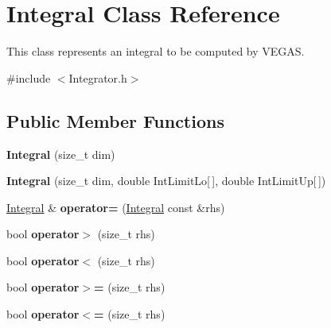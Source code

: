 \hypertarget{classIntegral}{}\section{Integral Class Reference}
\label{classIntegral}


This class represents an integral to be computed by V\+E\+G\+A\+S.  




{\ttfamily \#include $<$Integrator.\+h$>$}

\subsection*{Public Member Functions}
\begin{DoxyCompactItemize}
\item 
\hypertarget{classIntegral_a958228701e11668d62cb716a794627ae}{}{\bfseries Integral} (size\+\_\+t dim)\label{classIntegral_a958228701e11668d62cb716a794627ae}

\item 
\hypertarget{classIntegral_af859a39ddd8447a08351b2185b4fa4dc}{}{\bfseries Integral} (size\+\_\+t dim, double Int\+Limit\+Lo\mbox{[}$\,$\mbox{]}, double Int\+Limit\+Up\mbox{[}$\,$\mbox{]})\label{classIntegral_af859a39ddd8447a08351b2185b4fa4dc}

\item 
\hypertarget{classIntegral_af89fcd97e32bbacc527b3f5002498d52}{}\hyperlink{classIntegral}{Integral} \& {\bfseries operator=} (\hyperlink{classIntegral}{Integral} const \&rhs)\label{classIntegral_af89fcd97e32bbacc527b3f5002498d52}

\item 
\hypertarget{classIntegral_a22bfa4c5fcccc8921f314a0594d10273}{}bool {\bfseries operator$>$} (size\+\_\+t rhs)\label{classIntegral_a22bfa4c5fcccc8921f314a0594d10273}

\item 
\hypertarget{classIntegral_a17a701ae693301d53924c0f093e9348e}{}bool {\bfseries operator$<$} (size\+\_\+t rhs)\label{classIntegral_a17a701ae693301d53924c0f093e9348e}

\item 
\hypertarget{classIntegral_afaad3e58d70d8714d47667218fd0b2b2}{}bool {\bfseries operator$>$=} (size\+\_\+t rhs)\label{classIntegral_afaad3e58d70d8714d47667218fd0b2b2}

\item 
\hypertarget{classIntegral_a391da51e4234f840797230301e914c59}{}bool {\bfseries operator$<$=} (size\+\_\+t rhs)\label{classIntegral_a391da51e4234f840797230301e914c59}


\end{DoxyCompactItemize}
